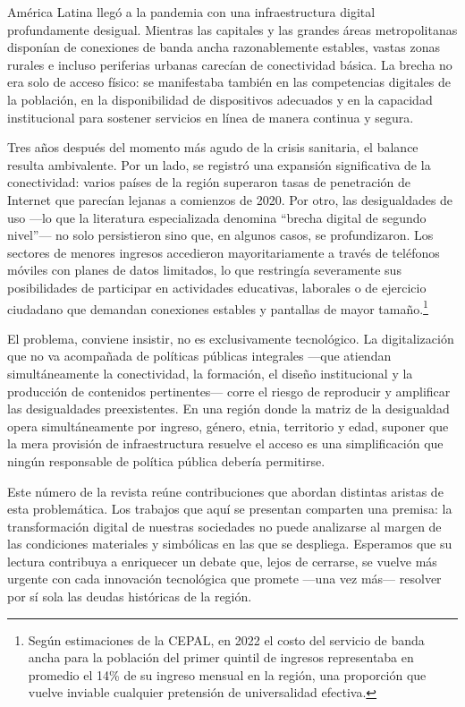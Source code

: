 \documentclass{article}
\begin{document}
América Latina llegó a la pandemia con una infraestructura digital profundamente desigual. Mientras las capitales y las grandes áreas metropolitanas disponían de conexiones de banda ancha razonablemente estables, vastas zonas rurales e incluso periferias urbanas carecían de conectividad básica. La brecha no era solo de acceso físico: se manifestaba también en las competencias digitales de la población, en la disponibilidad de dispositivos adecuados y en la capacidad institucional para sostener servicios en línea de manera continua y segura.

Tres años después del momento más agudo de la crisis sanitaria, el balance resulta ambivalente. Por un lado, se registró una expansión significativa de la conectividad: varios países de la región superaron tasas de penetración de Internet que parecían lejanas a comienzos de 2020. Por otro, las desigualdades de uso —lo que la literatura especializada denomina “brecha digital de segundo nivel”— no solo persistieron sino que, en algunos casos, se profundizaron. Los sectores de menores ingresos accedieron mayoritariamente a través de teléfonos móviles con planes de datos limitados, lo que restringía severamente sus posibilidades de participar en actividades educativas, laborales o de ejercicio ciudadano que demandan conexiones estables y pantallas de mayor tamaño.\footnote{Según estimaciones de la CEPAL, en 2022 el costo del servicio de
banda ancha para la población del primer quintil de ingresos
representaba en promedio el 14\% de su ingreso mensual en la región, una
proporción que vuelve inviable cualquier pretensión de universalidad
efectiva.}

El problema, conviene insistir, no es exclusivamente tecnológico. La digitalización que no va acompañada de políticas públicas integrales —que atiendan simultáneamente la conectividad, la formación, el diseño institucional y la producción de contenidos pertinentes— corre el riesgo de reproducir y amplificar las desigualdades preexistentes. En una región donde la matriz de la desigualdad opera simultáneamente por ingreso, género, etnia, territorio y edad, suponer que la mera provisión de infraestructura resuelve el acceso es una simplificación que ningún responsable de política pública debería permitirse.

Este número de la revista reúne contribuciones que abordan distintas aristas de esta problemática. Los trabajos que aquí se presentan comparten una premisa: la transformación digital de nuestras sociedades no puede analizarse al margen de las condiciones materiales y simbólicas en las que se despliega. Esperamos que su lectura contribuya a enriquecer un debate que, lejos de cerrarse, se vuelve más urgente con cada innovación tecnológica que promete —una vez más— resolver por sí sola las deudas históricas de la región.
\end{document}
